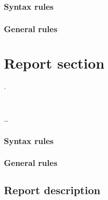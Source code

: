 \subsubsection{Syntax rules}

\subsubsection{General rules}

\section{Report section}
\begin{syntax}
   .\newline
  \begin{0-1}
     \\
  \end{0-1}\ldots
\end{syntax}

\subsubsection{Syntax rules}

\subsubsection{General rules}

\subsection{Report description}

